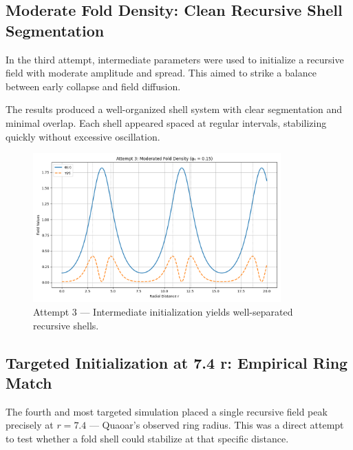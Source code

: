 \documentclass[12pt]{article}
\begin{document}
\vspace{1em}
\FloatBarrier


\subsection{Moderate Fold Density: Clean Recursive Shell Segmentation}

In the third attempt, intermediate parameters were used to initialize a recursive field with moderate amplitude and spread. This aimed to strike a balance between early collapse and field diffusion.

The results produced a well-organized shell system with clear segmentation and minimal overlap. Each shell appeared spaced at regular intervals, stabilizing quickly without excessive oscillation.

\vspace{1em}
\begin{figure}[H]
  \centering
  \includegraphics[width=0.85\textwidth]{attempt_3_sim.png}
  \caption{Attempt 3 — Intermediate initialization yields well-separated recursive shells.}
\end{figure}

\vspace{1em}
\FloatBarrier

\subsection{Targeted Initialization at 7.4 r: Empirical Ring Match}

The fourth and most targeted simulation placed a single recursive field peak precisely at $r = 7.4$ — Quaoar’s observed ring radius. This was a direct attempt to test whether a fold shell could stabilize at that specific distance.
\end{document}
